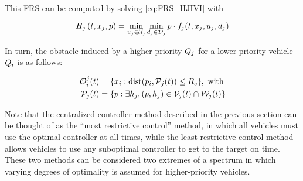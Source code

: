 This FRS can be computed by solving \eqref{eq:FRS_HJIVI} with

\begin{equation}
H_j\left(t, x_j, p\right) = \min_{u_j \in \mathcal{U}_j} \min_{d_j \in \mathcal{D}_j} p \cdot f_j(t, x_j, u_j, d_j)
\end{equation}

In turn, the obstacle induced by a higher priority $Q_j$ for a lower priority vehicle $Q_i$ is as follows:

\begin{equation}
\begin{aligned}
\mathcal{O}_i^j(t) &= \{x_i: \text{dist}(p_i, \mathcal{P}_j(t)) \le R_c \}, \text{ with} \\
\mathcal{P}_j(t) &= \{p: \exists h_j, (p, h_j) \in \mathcal{V}_j(t) \cap \mathcal{W}_j(t)\}
\end{aligned}
\end{equation}

Note that the centralized controller method described in the previous section can be thought of as the ``most restrictive control'' method, in which all vehicles must use the optimal controller at all times, while the least restrictive control method allows vehicles to use any suboptimal controller to get to the target on time. These two methods can be considered two extremes of a spectrum in which varying degrees of optimality is assumed for higher-priority vehicles.